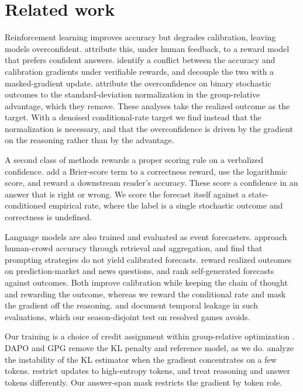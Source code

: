 \section{Related work}
\label{sec:related}

Reinforcement learning improves accuracy but degrades calibration, leaving models overconfident.
\citet{leng2024} attribute this, under human feedback, to a reward model that prefers confident answers.
\citet{dcpo} identify a conflict between the accuracy and calibration gradients under verifiable rewards,
and decouple the two with a masked-gradient update. \citet{uncalibrated_reasoning} attribute the
overconfidence on binary stochastic outcomes to the standard-deviation normalization in the
group-relative advantage, which they remove. These analyses take the realized outcome as the target.
With a denoised conditional-rate target we find instead that the normalization is necessary, and that the
overconfidence is driven by the gradient on the reasoning rather than by the advantage.

A second class of methods rewards a proper scoring rule on a verbalized confidence. \citet{rlcr} add a
Brier-score term to a correctness reward, \citet{rewarding_doubt} use the logarithmic score, and
\citet{band2024} reward a downstream reader's accuracy. These score a confidence in an answer that is
right or wrong. We score the forecast itself against a state-conditioned empirical rate, where the label
is a single stochastic outcome and correctness is undefined.

Language models are also trained and evaluated as event forecasters. \citet{halawi2024} approach
human-crowd accuracy through retrieval and aggregation, and \citet{pratt2024} find that prompting
strategies do not yield calibrated forecasts. \citet{turtel2025outcome} reward realized outcomes on
prediction-market and news questions, and \citet{turtel2025selftaught} rank self-generated forecasts
against outcomes. Both improve calibration while keeping the chain of thought and rewarding the outcome,
whereas we reward the conditional rate and mask the gradient off the reasoning. \citet{paleka2025} and
\citet{karger2024forecastbench} document temporal leakage in such evaluations, which our season-disjoint
test on resolved games avoids.

Our training is a choice of credit assignment within group-relative optimization \citep{grpo}. DAPO
\citep{dapo} and GPG \citep{gpg2026} remove the KL penalty and reference model, as we do. \citet{rpg2026}
analyze the instability of the KL estimator when the gradient concentrates on a few tokens.
\citet{wang2025entropy} restrict updates to high-entropy tokens, and \citet{archer2025, gtpo2025} treat
reasoning and answer tokens differently. Our answer-span mask restricts the gradient by token role.

